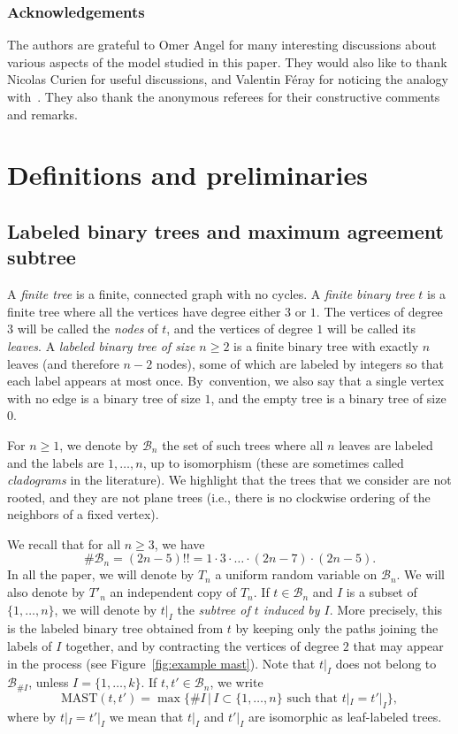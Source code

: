 \documentclass[11pt]{article}
\newcommand{\ie}{i.e.,\xspace}
\newcommand{\MAST}{\mathrm{MAST}}
\newcommand{\Bb}{\mathcal{B}}
\theoremstyle{plain}
\theoremstyle{definition}
\numberwithin{equation}{section}
\begin{document}
\subsubsection*{Acknowledgements} The authors are grateful to Omer Angel
for many interesting discussions about various aspects of the model studied in this paper. They would also like to thank Nicolas Curien for useful discussions, and Valentin Féray for noticing the analogy with~\cite{BBDFGMP22, borga_power_2023}.
They also thank the anonymous referees for their constructive comments and remarks.

\section{Definitions and preliminaries}\label{sec:definitions and preliminaries}

\subsection{Labeled binary trees and maximum agreement subtree}\label{subsec_discrete_defns}

A \emph{finite tree} is a finite, connected graph with no cycles.
A \emph{finite binary tree} $t$ is a finite tree where all the vertices have degree either $3$ or $1$.
The vertices of degree $3$ will be called the \emph{nodes} of $t$, and the vertices of degree $1$ will be called its \emph{leaves}.
A \emph{labeled binary tree of size $n \geq 2$} is a finite binary tree with exactly $n$ leaves (and therefore $n-2$ nodes), some of which are labeled by integers so that each label appears at most once. By~convention, we also say that a single vertex with no edge is a binary tree of size $1$, and the empty tree is a binary tree of size $0$.

For $n \geq 1$, we denote by $\Bb_n$ the set of such trees where all $n$ leaves are labeled and the labels are $1, \dots, n$, up to isomorphism (these are sometimes called \emph{cladograms} in the literature).
We highlight that the trees that we consider are not rooted, and they are not plane trees (\ie there is no clockwise ordering of the neighbors of a fixed vertex).

We recall that for all $n \geq 3$, we have\vspace*{-3pt}
\[ \# \Bb_n = (2n-5)!!=1 \cdot 3 \cdot \dots \cdot (2n-7) \cdot (2n-5). \]
In all the paper, we will denote by $T_n$ a uniform random variable on $\Bb_n$.
We will also denote by $T'_n$ an independent copy of $T_n$. If $t \in \Bb_n$ and $I$ is a subset of $\{1,\dots,n\}$, we will denote by $t|_I$ the \emph{subtree of $t$ induced by $I$}.
More precisely, this is the labeled binary tree obtained from $t$ by keeping only the paths joining the labels of $I$ together, and by contracting the vertices of degree $2$ that may appear in the process (see Figure~\ref{fig:example mast}). Note that $t|_I$ does not belong to $\Bb_{\#I}$, unless $I=\{1,\dots,k\}$. If $t,t' \in \Bb_n$, we write\vspace*{-3pt}\enlargethispage{.5\baselineskip}
\[ \MAST(t,t')=\max \bigl\{ \#I \, \big|\, I \subset \{1,\dots,n\} \mbox{ such that } t|_I=t'|_I \bigr\},\]
where by $t|_I=t'|_I$ we mean that $t|_I$ and $t'|_I$ are isomorphic as leaf-labeled trees.
\end{document}
